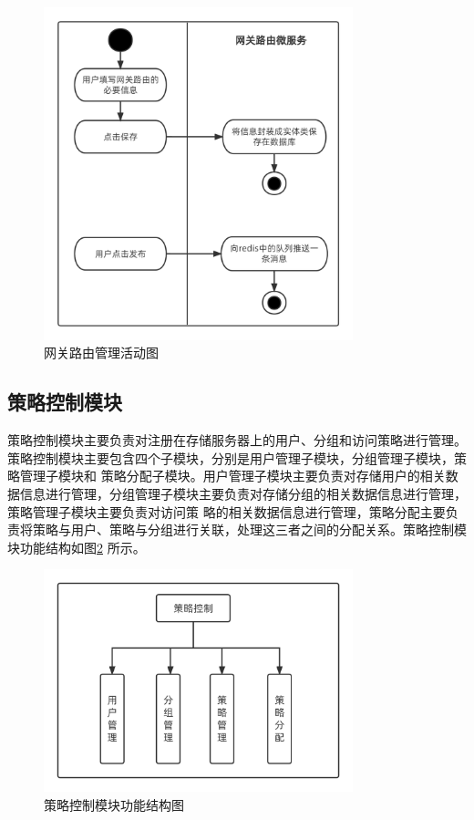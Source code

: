 \begin{figure}[htb]
    \centering
    \includegraphics[width=0.8\textwidth]{my_figures/chapter4/网关路由管理活动图.png}
    \caption{网关路由管理活动图}
    \label{fig:网关路由管理活动图}
\end{figure}

\subsection{策略控制模块}

策略控制模块主要负责对注册在存储服务器上的用户、分组和访问策略进行管理。策略控制模块主要包含四个子模块，分别是用户管理子模块，分组管理子模块，策略管理子模块和
策略分配子模块。用户管理子模块主要负责对存储用户的相关数据信息进行管理，分组管理子模块主要负责对存储分组的相关数据信息进行管理，策略管理子模块主要负责对访问策
略的相关数据信息进行管理，策略分配主要负责将策略与用户、策略与分组进行关联，处理这三者之间的分配关系。策略控制模块功能结构如图\ref{fig:策略控制模块功能结构图}
所示。

\begin{figure}[htb]
    \centering
    \includegraphics[width=0.8\textwidth]{my_figures/chapter4/策略控制模块功能结构图.png}
    \caption{策略控制模块功能结构图}
    \label{fig:策略控制模块功能结构图}
\end{figure}

